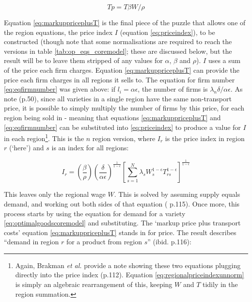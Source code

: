 {\begin{equation}
T p = {T \beta W /} \rho\label{eq:markuppriceplusT}
\end{equation}

Equation \eqref{eq:markuppriceplusT} is the final piece of the puzzle that allows one of the region equations, the price index $I$ (equation \ref{eq:priceindex}), to be constructed (though note that some normalisations are required to reach the versions in table \ref{tab:op_eqs_coremodel}; these are discussed below, but the result will be to leave them stripped of any values for $\alpha$, $\beta$ and $\rho$). $I$ uses a sum of the price each firm charges. Equation \eqref{eq:markuppriceplusT} can provide the price each firm charges in all regions it sells to. The equation for firm number \eqref{eq:eqfirmnumber} was given above: if $l_{i} = \alpha \epsilon$, the number of firms is $\lambda_{n} \delta / \alpha \epsilon$. As \citealt{fujita_spatial_2001} note (p.50), since all varieties in a single region have the same non-transport price, it is possible to simply multiply the number of firms by this price, for each region being sold in - meaning that equations \eqref{eq:markuppriceplusT} and \eqref{eq:eqfirmnumber} can be substituted into \eqref{eq:priceindex} to produce a value for $I$ in each region\footnote{Again, Brakman \emph{et al.} provide a note showing these two equations plugging directly into the price index (p.112). Equation \eqref{eq:regionalpriceindexunnorm} is simply an algebraic rearrangement of this, keeping $W$ and $T$ tidily in the region summation.}. This is the $n$ region version, where $I_{r}$ is the price index in region $r$ (`here') and $s$ is an index for all regions:

\begin{equation}
I_{r} = \left(\frac{\beta}{\rho}\right)\left(\frac{\delta}{\alpha\epsilon}\right)^{\frac{1}{1-\epsilon}} \left[\sum_{s=1}^{N}\lambda_{s}W_{s}^{1-\epsilon}T_{rs}^{1-\epsilon}\right]^{\frac{1}{1-\epsilon}}\label{eq:regionalpriceindexunnorm}
\end{equation}

This leaves only the regional wage $W$. This is solved by assuming supply equals demand, and working out both sides of that equation (\citealt{brakman_new_2009} p.115). Once more, this process starts by using the equation for demand for a variety \eqref{eq:optimalgoodscoremodel} and substituting. The `markup price plus transport costs' equation \eqref{eq:markuppriceplusT} stands in for price. The result describes ``demand in region $r$ for a product from region $s$'' (ibid. p.116):

}
